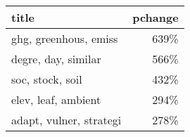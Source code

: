 \begin{tabular}{p{1.2cm}r}
\toprule
                   title &  pchange \\
\midrule
   ghg, greenhous, emiss &     639\% \\
     degre, day, similar &     566\% \\
        soc, stock, soil &     432\% \\
     elev, leaf, ambient &     294\% \\
 adapt, vulner, strategi &     278\% \\
\bottomrule
\end{tabular}
